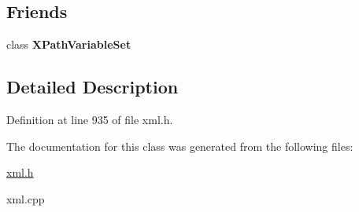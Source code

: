 \subsection*{Friends}
\begin{DoxyCompactItemize}
\item 
\hypertarget{classphys_1_1xml_1_1XPathVariable_a6d8e28205e67fa0164160dd3cb547fe6}{
class {\bfseries XPathVariableSet}}
\label{df/dee/classphys_1_1xml_1_1XPathVariable_a6d8e28205e67fa0164160dd3cb547fe6}

\end{DoxyCompactItemize}


\subsection{Detailed Description}


Definition at line 935 of file xml.h.



The documentation for this class was generated from the following files:\begin{DoxyCompactItemize}
\item 
\hyperlink{xml_8h}{xml.h}\item 
xml.cpp\end{DoxyCompactItemize}
